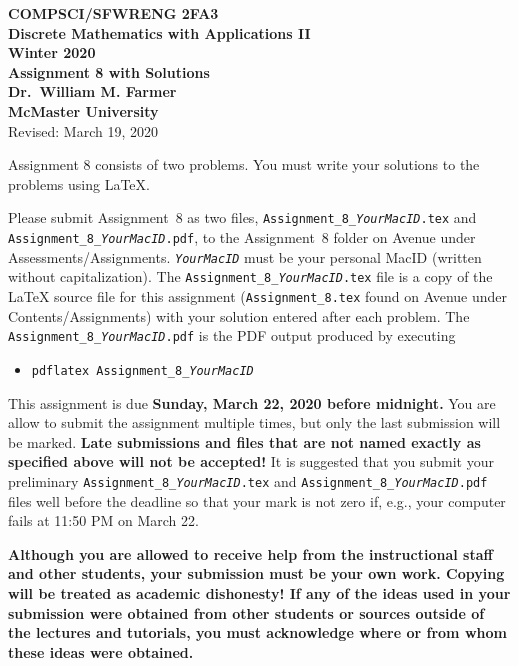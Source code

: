 \documentclass[11pt,fleqn]{article}
\begin{document}
\begin{center}

  {\large \textbf{COMPSCI/SFWRENG 2FA3}}\\[2mm]
  {\large \textbf{Discrete Mathematics with Applications II}}\\[2mm]
  {\large \textbf{Winter 2020}}\\[8mm]
  {\huge \textbf{Assignment 8 with Solutions}}\\[6mm]
  {\large \textbf{Dr.~William M. Farmer}}\\[2mm]
  {\large \textbf{McMaster University}}\\[6mm]
  {\large Revised: March 19, 2020}

\end{center}

\medskip

Assignment 8 consists of two problems.  You must write your solutions
to the problems using LaTeX.

Please submit Assignment~8 as two files,
\texttt{Assignment\_8\_\emph{YourMacID}.tex} and
\texttt{Assignment\_8\_\emph{YourMacID}.pdf}, to the Assignment~8
folder on Avenue under Assessments/Assignments.
\texttt{\emph{YourMacID}} must be your personal MacID (written without
capitalization).  The \texttt{Assignment\_8\_\emph{YourMacID}.tex}
file is a copy of the LaTeX source file for this assignment
(\texttt{Assignment\_8.tex} found on Avenue under
Contents/Assignments) with your solution entered after each problem.
The \texttt{Assignment\_8\_\emph{YourMacID}.pdf} is the PDF output
produced by executing

\begin{itemize}

  \item[] \texttt{pdflatex Assignment\_8\_\emph{YourMacID}}

\end{itemize}

This assignment is due \textbf{Sunday, March 22, 2020 before
  midnight.}  You are allow to submit the assignment multiple times,
but only the last submission will be marked.  \textbf{Late submissions
  and files that are not named exactly as specified above will not be
  accepted!}  It is suggested that you submit your preliminary
\texttt{Assignment\_8\_\emph{YourMacID}.tex} and
\texttt{Assignment\_8\_\emph{YourMacID}.pdf} files well before the
deadline so that your mark is not zero if, e.g., your computer fails
at 11:50 PM on March 22.

\textbf{Although you are allowed to receive help from the
  instructional staff and other students, your submission must be your
  own work.  Copying will be treated as academic dishonesty! If any of
  the ideas used in your submission were obtained from other students
  or sources outside of the lectures and tutorials, you must
  acknowledge where or from whom these ideas were obtained.}
\end{document}
